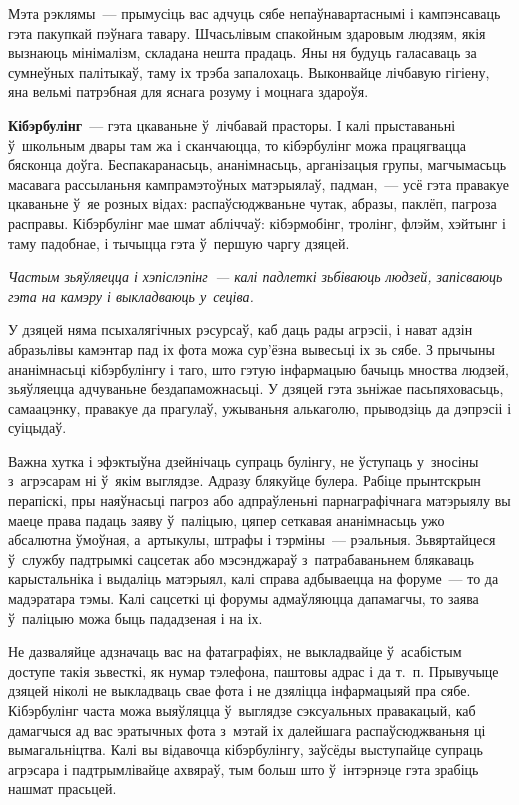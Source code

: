Мэта рэклямы~--- прымусіць вас адчуць сябе непаўнавартаснымі і кампэнсаваць гэта пакупкай пэўнага тавару. Шчасьлівым спакойным здаровым людзям, якія вызнаюць мінімалізм, складана нешта прадаць. Яны ня будуць галасаваць за сумнеўных палітыкаў, таму іх трэба запалохаць. Выконвайце лічбавую гігіену, яна вельмі патрэбная для яснага розуму і моцнага здароўя.

\textbf{Кібэрбулінг}~--- гэта цкаваньне ў~лічбавай прасторы. І калі прыставаньні ў~школьным двары там жа і сканчаюцца, то кібэрбулінг можа працягвацца бясконца доўга. Беспакаранасьць, ананімнасьць, арганізацыя групы, магчымасьць масавага рассыланьня кампрамэтоўных матэрыялаў, падман,~--- усё гэта правакуе цкаваньне ў~яе розных відах: распаўсюджваньне чутак, абразы, паклёп, пагроза расправы. Кібэрбулінг мае шмат абліччаў: кібэрмобінг, тролінг, флэйм, хэйтынг і таму падобнае, і тычыцца гэта ў~першую чаргу дзяцей.

\emph{Частым зьяўляецца і хэпіслэпінг~--- калі падлеткі зьбіваюць людзей, запісваюць гэта на камэру і выкладваюць у~сеціва.}

У дзяцей няма псыхалягічных рэсурсаў, каб даць рады агрэсіі, і нават адзін абразьлівы камэнтар пад іх фота можа сур'ёзна вывесьці іх зь сябе. З прычыны ананімнасьці кібэрбулінгу і таго, што гэтую інфармацыю бачыць мноства людзей, зьяўляецца адчуваньне бездапаможнасьці. У дзяцей гэта зьніжае пасьпяховасьць, самаацэнку, правакуе да прагулаў, ужываньня алькаголю, прыводзіць да дэпрэсіі і суіцыдаў.

Важна хутка і эфэктыўна дзейнічаць супраць булінгу, не ўступаць у~зносіны з~агрэсарам ні ў~якім выглядзе. Адразу блякуйце булера. Рабіце прынтскрын перапіскі, пры наяўнасьці пагроз або адпраўленьні парнаграфічнага матэрыялу вы маеце права падаць заяву ў~паліцыю, цяпер сеткавая ананімнасьць ужо абсалютна ўмоўная, а~артыкулы, штрафы і тэрміны~--- рэальныя. Зьвяртайцеся ў~службу падтрымкі сацсетак або мэсэнджараў з~патрабаваньнем блякаваць карыстальніка і выдаліць матэрыял, калі справа адбываецца на форуме~--- то да мадэратара тэмы. Калі сацсеткі ці форумы адмаўляюцца дапамагчы, то заява ў~паліцыю можа быць пададзеная і на іх.

Не дазваляйце адзначаць вас на фатаграфіях, не выкладвайце ў~асабістым доступе такія зьвесткі, як нумар тэлефона, паштовы адрас і да т.~п. Прывучыце дзяцей ніколі не выкладваць свае фота і не дзяліцца інфармацыяй пра сябе. Кібэрбулінг часта можа выяўляцца ў~выглядзе сэксуальных правакацый, каб дамагчыся ад вас эратычных фота з~мэтай іх далейшага распаўсюджваньня ці вымагальніцтва. Калі вы відавочца кібэрбулінгу, заўсёды выступайце супраць агрэсара і падтрымлівайце ахвяраў, тым больш што ў~інтэрнэце гэта зрабіць нашмат прасьцей.

